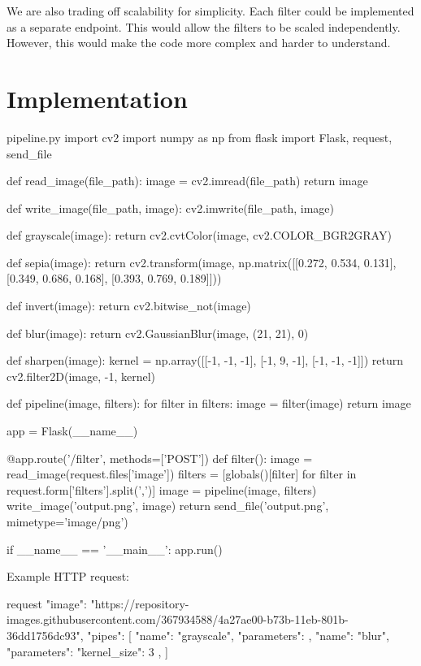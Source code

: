 \documentclass{csse4400}
\begin{document}
We are also trading off scalability for simplicity.
Each filter could be implemented as a separate endpoint.
This would allow the filters to be scaled independently.
However, this would make the code more complex and harder to understand.

\section{Implementation}

\begin{code}[language=python]{pipeline.py}
import cv2
import numpy as np
from flask import Flask, request, send_file


def read_image(file_path):
    image = cv2.imread(file_path)
    return image

def write_image(file_path, image):
    cv2.imwrite(file_path, image)

def grayscale(image):
    return cv2.cvtColor(image, cv2.COLOR_BGR2GRAY)

def sepia(image):
    return cv2.transform(image, np.matrix([[0.272, 0.534, 0.131],
                                           [0.349, 0.686, 0.168],
                                           [0.393, 0.769, 0.189]]))

def invert(image):
    return cv2.bitwise_not(image)

def blur(image):
    return cv2.GaussianBlur(image, (21, 21), 0)

def sharpen(image):
    kernel = np.array([[-1, -1, -1],
                       [-1,  9, -1],
                       [-1, -1, -1]])
    return cv2.filter2D(image, -1, kernel)

def pipeline(image, filters):
    for filter in filters:
        image = filter(image)
    return image

app = Flask(__name__)

@app.route('/filter', methods=['POST'])
def filter():
    image = read_image(request.files['image'])
    filters = [globals()[filter] for filter in request.form['filters'].split(',')]
    image = pipeline(image, filters)
    write_image('output.png', image)
    return send_file('output.png', mimetype='image/png')

if __name__ == '__main__':
    app.run()
\end{code}

Example HTTP request:

\begin{code}[language=json]{request}
{
  "image": "https://repository-images.githubusercontent.com/367934588/4a27ae00-b73b-11eb-801b-36dd1756dc93",
  "pipes": [
    {
      "name": "grayscale",
      "parameters": {}
    },
    {
      "name": "blur",
      "parameters": {
        "kernel_size": 3
      }
    },
  ]
}
\end{code}
\end{document}
